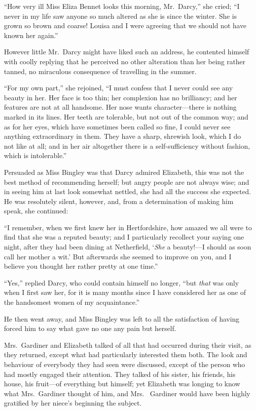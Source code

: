 ``How very ill Miss Eliza Bennet looks this morning, Mr.\ Darcy,''
she cried; ``I never in my life saw anyone so much altered as she
is since the winter.  She is grown so brown and coarse!  Louisa
and I were agreeing that we should not have known her again.''

However little Mr.\ Darcy might have liked such an address, he
contented himself with coolly replying that he perceived no
other alteration than her being rather tanned, no miraculous
consequence of travelling in the summer.

``For my own part,'' she rejoined, ``I must confess that I never
could see any beauty in her.  Her face is too thin; her
complexion has no brilliancy; and her features are not at all
handsome.  Her nose wants character---there is nothing marked
in its lines.  Her teeth are tolerable, but not out of the common
way; and as for her eyes, which have sometimes been called so
fine, I could never see anything extraordinary in them.  They
have a sharp, shrewish look, which I do not like at all; and in her
air altogether there is a self-sufficiency without fashion, which
is intolerable.''

Persuaded as Miss Bingley was that Darcy admired Elizabeth,
this was not the best method of recommending herself; but
angry people are not always wise; and in seeing him at last look
somewhat nettled, she had all the success she expected.  He was
resolutely silent, however, and, from a determination of making
him speak, she continued:

``I remember, when we first knew her in Hertfordshire, how
amazed we all were to find that she was a reputed beauty; and I
particularly recollect your saying one night, after they had been
dining at Netherfield, `\emph{She} a beauty!---I should as soon call her
mother a wit.'  But afterwards she seemed to improve on you,
and I believe you thought her rather pretty at one time.''

``Yes,'' replied Darcy, who could contain himself no longer,
``but \emph{that} was only when I first saw her, for it is many months
since I have considered her as one of the handsomest women of
my acquaintance.''

He then went away, and Miss Bingley was left to all the
satisfaction of having forced him to say what gave no one any
pain but herself.

Mrs.\ Gardiner and Elizabeth talked of all that had occurred during
their visit, as they returned, except what had particularly
interested them both.  The look and behaviour of everybody they
had seen were discussed, except of the person who had mostly
engaged their attention.  They talked of his sister, his friends,
his house, his fruit---of everything but himself; yet Elizabeth
was longing to know what Mrs.\ Gardiner thought of him, and Mrs.\ %
Gardiner would have been highly gratified by her niece's beginning
the subject.



